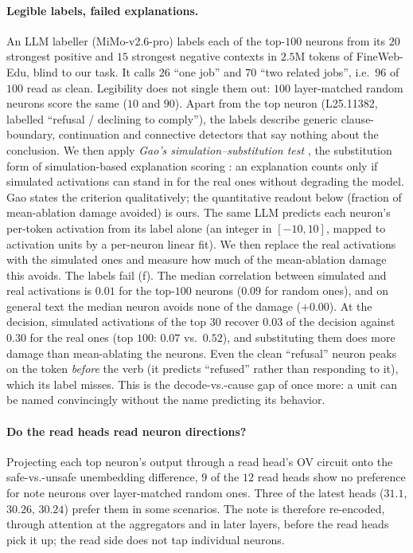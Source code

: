 \paragraph{Legible labels, failed explanations.} An LLM labeller (MiMo-v2.6-pro) labels each of the top-$100$
neurons from its $20$ strongest positive and $15$ strongest negative contexts in $2.5$M tokens of
FineWeb-Edu, blind to our task. It calls $26$ ``one job'' and $70$ ``two related jobs'', i.e.\ $96$ of $100$
read as clean. Legibility does not single them out: $100$ layer-matched random neurons score the same ($10$
and $90$). Apart from the top neuron (L25.11382, labelled ``refusal / declining to comply''), the labels
describe generic clause-boundary, continuation and connective detectors that say nothing about the
conclusion. We then apply \emph{Gao's simulation--substitution test} \citep{gao2026notclean}, the substitution form of
simulation-based explanation scoring \citep{bills2023explain}: an explanation counts only if simulated
activations can stand in for the real ones without degrading the model. Gao states the criterion
qualitatively; the quantitative readout below (fraction of mean-ablation damage avoided) is ours. The same LLM predicts each neuron's per-token activation from
its label alone (an integer in $[-10,10]$, mapped to activation units by a per-neuron linear fit). We then
replace the real activations with the simulated ones and measure how much of the mean-ablation damage this
avoids. The labels fail (f). The median correlation between simulated and real
activations is $0.01$ for the top-$100$ neurons ($0.09$ for random ones), and on general text the median
neuron avoids none of the damage ($+0.00$). At the decision, simulated activations of the top $30$ recover
$0.03$ of the decision against $0.30$ for the real ones (top $100$: $0.07$ vs.\ $0.52$), and substituting
them does more damage than mean-ablating the neurons. Even the clean ``refusal'' neuron peaks on the token
\emph{before} the verb (it predicts ``refused'' rather than responding to it), which its label misses. This is
the decode-vs.-cause gap of  once more: a unit can be named convincingly without the name
predicting its behavior.

\paragraph{Do the read heads read neuron directions?} Projecting each top neuron's output through a read
head's OV circuit onto the safe-vs.-unsafe unembedding difference, $9$ of the $12$ read heads show no
preference for note neurons over layer-matched random ones. Three of the latest heads ($31.1$, $30.26$,
$30.24$) prefer them in some scenarios. The note is therefore re-encoded, through attention at the
aggregators and in later layers, before the read heads pick it up; the read side does not tap individual
neurons.

